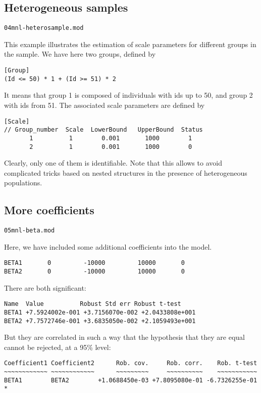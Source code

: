 \documentclass[12pt]{memoir}
\begin{document}
\subsection{Heterogeneous samples}
\begin{flushright}
\verb+04mnl-heterosample.mod+
\end{flushright}
This example illustrates the estimation of scale parameters for
different groups in the sample. We have here two groups, defined by
\small
{\footnotesize
\begin{verbatim}
[Group]
(Id <= 50) * 1 + (Id >= 51) * 2
\end{verbatim}
}
\normalsize
It means that group 1 is composed of individuals with ids up to
 50, and group 2 with ids from 51.
The associated scale parameters are defined by
\small
{\footnotesize
\begin{verbatim}
[Scale]
// Group_number  Scale  LowerBound   UpperBound  Status
       1          1        0.001       1000        1
       2          1        0.001       1000        0
\end{verbatim}
}
\normalsize

Clearly, only one of them is identifiable. Note that this allows to
avoid complicated tricks based on nested structures in the presence of
heterogeneous populations. 

\subsection{More coefficients}
\begin{flushright}
\verb+05mnl-beta.mod+
\end{flushright}
Here, we have included some additional coefficients into the model.
\small
{\footnotesize
\begin{verbatim}
BETA1       0         -10000         10000       0
BETA2       0         -10000         10000       0
\end{verbatim}
}
\normalsize

There are both significant:
\small
{\footnotesize
\begin{verbatim}
Name  Value          Robust Std err Robust t-test
BETA1 +7.5924002e-001 +3.7156070e-002 +2.0433808e+001
BETA2 +7.7572746e-001 +3.6835050e-002 +2.1059493e+001
\end{verbatim}
}
\normalsize

But they are correlated in such a way that the hypothesis that they
are equal cannot be rejected, at a 95\% level:
\footnotesize
{\footnotesize
\begin{verbatim}
Coefficient1 Coefficient2      Rob. cov.     Rob. corr.    Rob. t-test
~~~~~~~~~~~~ ~~~~~~~~~~~~      ~~~~~~~~~     ~~~~~~~~~~    ~~~~~~~~~~~
BETA1        BETA2        +1.0688450e-03 +7.8095080e-01	-6.7326255e-01 *
\end{verbatim}
}
\normalsize
\end{document}
